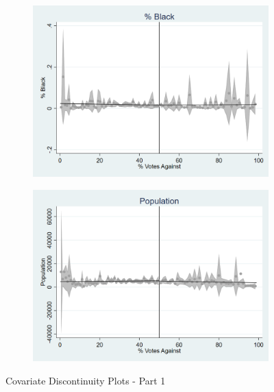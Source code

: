 \begin{figure}[ht]
    \vspace{1em}

    \begin{minipage}[b]{0.48\textwidth}
        \centering
        \begin{subfigure}[b]{\textwidth}
            \centering
            \includegraphics[width=\textwidth,keepaspectratio]{images/cov_smoothness_pctblack.png}
            \label{fig:black_sm}
        \end{subfigure}
    \end{minipage}
    \hfill
    \begin{minipage}[b]{0.48\textwidth}
        \centering
        \begin{subfigure}[b]{\textwidth}
            \centering
            \includegraphics[width=\textwidth,keepaspectratio]{images/cov_smoothness_pop.png}
            \label{fig:pop_sm}
        \end{subfigure}
    \end{minipage}        


    \caption{Covariate Discontinuity Plots - Part 1}
    \label{fig:rd_cov_smoothness_1}
\end{figure}

